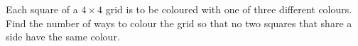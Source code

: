 Each square of a $4\times4$ grid is to be coloured with one of three different colours. Find the number of ways to colour the grid so that no two squares that share a side have the same colour.
